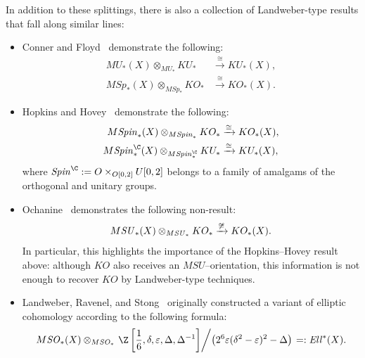 In addition to these splittings, there is also a collection of Landweber-type results that fall along similar lines:
\begin{itemize}
    \item Conner and Floyd~\cite{ConnerFloyd} demonstrate the following:
          \begin{align*}
          MU_*(X) \otimes_{MU_*} KU_* & \xrightarrow\cong KU_*(X), \\
          M\mathit{Sp}_*(X) \otimes_{M\mathit{Sp}_*} KO_* & \xrightarrow\cong KO_*(X).
          \end{align*}
    \item Hopkins and Hovey~\cite[Theorem 1]{HopkinsHovey} demonstrate the following:
          \begin{align*}
          M\Spin_*(X) \otimes_{M\Spin_*} KO_* & \xrightarrow\cong KO_*(X), \\
          M\Spin^{\C}_*(X) \otimes_{M\Spin^{\C}_*} KU_* & \xrightarrow\cong KU_*(X),
          \end{align*}
          where \(\Spin^{\C} := O \times_{O[0, 2]} U[0, 2]\) belongs to a family of amalgams of the orthogonal and unitary groups.
    \item Ochanine~\cite{OchanineSUModules} demonstrates the following non-result: \[M\mathit{SU}_*(X) \otimes_{M\mathit{SU}_*} KO_* \xrightarrow{\not\cong} KO_*(X).\]
          In particular, this highlights the importance of the Hopkins--Hovey result above: although \(KO\) also receives an \(MSU\)--orientation, this information is not enough to recover \(KO\) by Landweber-type techniques.
    \item Landweber, Ravenel, and Stong~\cite{LandweberEll,LRS} originally constructed a variant of elliptic cohomology according to the following formula: \[M\SO_*(X) \otimes_{M\SO_*} \left.\Z\left[\frac{1}{6}, \delta, \eps, \Delta, \Delta^{-1}\right] \middle/ \left(2^6 \eps (\delta^2 - \eps)^2 - \Delta\right)\right. =: \mathit{Ell}^*(X).\]
\end{itemize}

